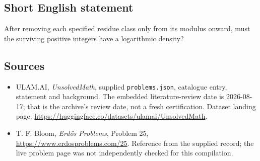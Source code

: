 \documentclass[11pt,a4paper]{article}
\begin{document}
\subsection{Short English statement}

After removing each specified residue class only from its modulus onward, must the surviving positive integers have a logarithmic density?

\subsection{Sources}

{\small

\begin{itemize}

\item[\hypertarget{source:statement:1}{S1}] ULAM.AI, \emph{UnsolvedMath}, supplied \texttt{problems.json}, catalogue entry, statement and background. The embedded literature-review date is 2026-08-17; that is the archive’s review date, not a fresh certification. Dataset landing page: \url{https://huggingface.co/datasets/ulamai/UnsolvedMath}.

\item[\hypertarget{source:statement:2}{S2}] T. F. Bloom, \emph{Erdős Problems}, Problem 25, \url{https://www.erdosproblems.com/25}. Reference from the supplied record; the live problem page was not independently checked for this compilation.

\end{itemize}

}

\label{end:statement}
\end{document}
